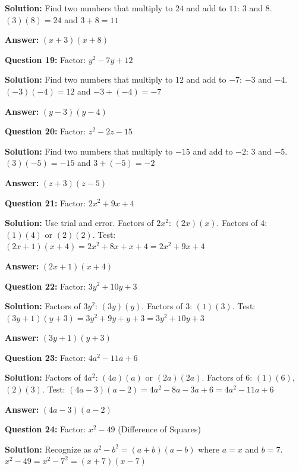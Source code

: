\documentclass[12pt]{article}
\begin{document}
\textbf{Solution:} Find two numbers that multiply to $24$ and add to $11$: $3$ and $8$. $(3)(8) = 24$ and $3 + 8 = 11$

\textbf{Answer:} $\boxed{(x + 3)(x + 8)}$

\vspace{0.3cm}
\noindent
\textbf{Question 19:} Factor: $y^2 - 7y + 12$

\textbf{Solution:} Find two numbers that multiply to $12$ and add to $-7$: $-3$ and $-4$. $(-3)(-4) = 12$ and $-3 + (-4) = -7$

\textbf{Answer:} $\boxed{(y - 3)(y - 4)}$

\vspace{0.3cm}
\noindent
\textbf{Question 20:} Factor: $z^2 - 2z - 15$

\textbf{Solution:} Find two numbers that multiply to $-15$ and add to $-2$: $3$ and $-5$. $(3)(-5) = -15$ and $3 + (-5) = -2$

\textbf{Answer:} $\boxed{(z + 3)(z - 5)}$

\vspace{0.3cm}
\noindent
\textbf{Question 21:} Factor: $2x^2 + 9x + 4$

\textbf{Solution:} Use trial and error. Factors of $2x^2$: $(2x)(x)$. Factors of $4$: $(1)(4)$ or $(2)(2)$. Test: $(2x + 1)(x + 4) = 2x^2 + 8x + x + 4 = 2x^2 + 9x + 4$ \checkmark

\textbf{Answer:} $\boxed{(2x + 1)(x + 4)}$

\vspace{0.3cm}
\noindent
\textbf{Question 22:} Factor: $3y^2 + 10y + 3$

\textbf{Solution:} Factors of $3y^2$: $(3y)(y)$. Factors of $3$: $(1)(3)$. Test: $(3y + 1)(y + 3) = 3y^2 + 9y + y + 3 = 3y^2 + 10y + 3$ \checkmark

\textbf{Answer:} $\boxed{(3y + 1)(y + 3)}$

\vspace{0.3cm}
\noindent
\textbf{Question 23:} Factor: $4a^2 - 11a + 6$

\textbf{Solution:} Factors of $4a^2$: $(4a)(a)$ or $(2a)(2a)$. Factors of $6$: $(1)(6)$, $(2)(3)$. Test: $(4a - 3)(a - 2) = 4a^2 - 8a - 3a + 6 = 4a^2 - 11a + 6$ \checkmark

\textbf{Answer:} $\boxed{(4a - 3)(a - 2)}$

\vspace{0.3cm}
\noindent
\textbf{Question 24:} Factor: $x^2 - 49$ (Difference of Squares)

\textbf{Solution:} Recognize as $a^2 - b^2 = (a + b)(a - b)$ where $a = x$ and $b = 7$. $x^2 - 49 = x^2 - 7^2 = (x + 7)(x - 7)$
\end{document}
